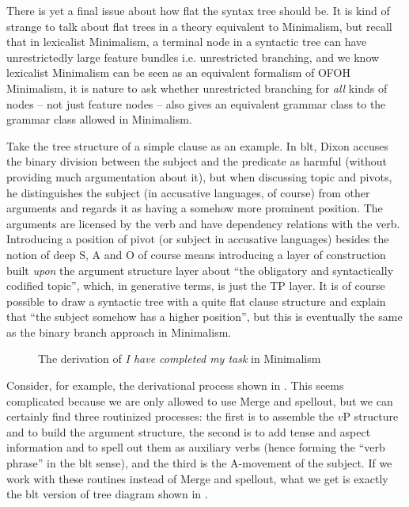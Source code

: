 \documentclass[../main.tex]{subfiles}
\begin{document}
There is yet a final issue about how flat the syntax tree should be. It is kind of strange to talk about 
flat trees in a theory equivalent to Minimalism, but recall that in lexicalist Minimalism, a terminal node 
in a syntactic tree can have unrestrictedly large feature bundles i.e. unrestricted branching, and 
we know lexicalist Minimalism can be seen as an equivalent formalism of OFOH Minimalism, it is nature 
to ask whether unrestricted branching for \emph{all} kinds of nodes -- not just feature nodes -- also gives 
an equivalent grammar class to the grammar class allowed in Minimalism.

Take the tree structure of a simple clause as an example. In \ac{blt}, Dixon accuses the binary division between 
the subject and the predicate as harmful (without providing much argumentation about it), but when discussing 
topic and pivots, he distinguishes the subject (in accusative languages, of course) from other arguments and regards it as having a somehow more 
prominent position. The arguments are licensed by the verb and have dependency relations with the verb. 
Introducing a position of pivot (or subject in accusative languages) besides the notion of deep S, A and O 
of course means introducing a layer of construction built \emph{upon} the argument structure layer
about ``the obligatory and syntactically codified topic'', 
which, in generative terms, is just the TP layer. It is of course possible to draw a syntactic tree 
with a quite flat clause structure and explain that ``the subject somehow has a higher position'', 
but this is eventually the same as the binary branch approach in Minimalism.

\begin{figure}
    \centering
    
    \caption{The derivation of \emph{I have completed my task} in Minimalism}
    \label{fig:complete-my-task-minimalism}
\end{figure}

Consider, for example, the derivational process shown in .
This seems complicated because we are only allowed to use Merge and spellout, but we can certainly 
find three routinized processes: the first is to assemble the $v$P structure and to build the argument 
structure, the second is to add tense and aspect information and to spell out them as auxiliary verbs
(hence forming the ``verb phrase'' in the \ac{blt} sense), and the third is the A-movement of the subject.
If we work with these routines instead of Merge and spellout, what we get is exactly the \ac{blt} version 
of tree diagram shown in .
\end{document}
